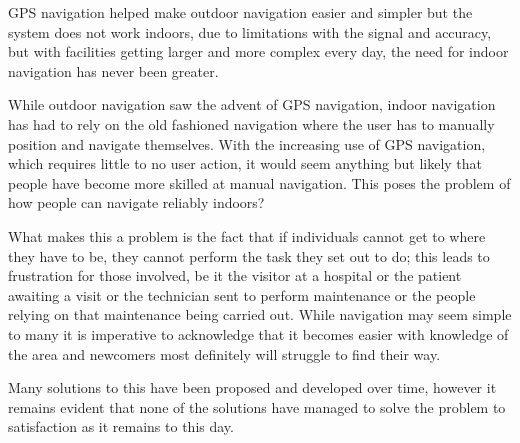 GPS navigation helped make outdoor navigation easier and simpler but the system does not work indoors, due to limitations with the signal and accuracy, but with facilities getting larger and more complex every day, the need for indoor navigation has never been greater.

While outdoor navigation saw the advent of GPS navigation, indoor navigation has had to rely on the old fashioned navigation where the user has to manually position and navigate themselves. With the increasing use of GPS navigation, which requires little to no user action, it would seem anything but likely that people have become more skilled at manual navigation. This poses the problem of how people can navigate reliably indoors?

What makes this a problem is the fact that if individuals cannot get to where they have to be, they cannot perform the task they set out to do; this leads to frustration for those involved, be it the visitor at a hospital or the patient awaiting a visit or the technician sent to perform maintenance or the people relying on that maintenance being carried out. While navigation may seem simple to many it is imperative to acknowledge that it becomes easier with knowledge of the area and newcomers most definitely will struggle to find their way.

Many solutions to this have been proposed and developed over time, however it remains evident that none of the solutions have managed to solve the problem to satisfaction as it remains to this day.
